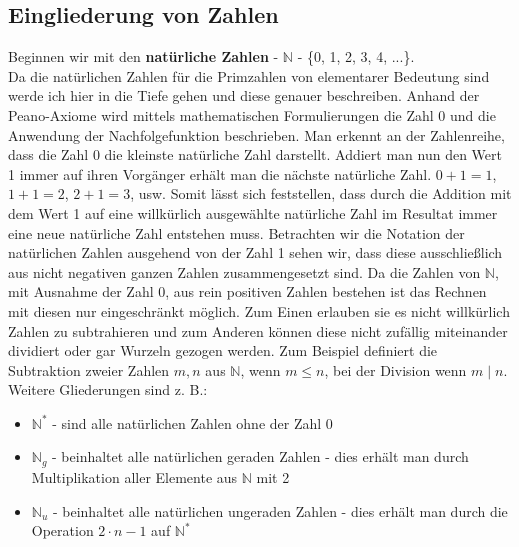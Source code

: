 \documentclass[german,12pt,a4paper]{article}
\begin{document}
\subsection{Eingliederung von Zahlen}\label{Eingliederung von Zahlen}
Beginnen wir mit den \textbf{natürliche Zahlen} - $\mathbb{N}$ - \{0, 1, 2, 3, 4, ...\}.\\
Da die natürlichen Zahlen für die Primzahlen von elementarer Bedeutung sind werde ich hier in die Tiefe gehen und diese genauer beschreiben.
Anhand der Peano-Axiome wird mittels mathematischen Formulierungen die Zahl 0 und die Anwendung der Nachfolgefunktion beschrieben.\newline 
Man erkennt an der Zahlenreihe, dass die Zahl 0 die kleinste natürliche Zahl darstellt.
Addiert man nun den Wert 1 immer auf ihren Vorgänger erhält man die nächste natürliche Zahl.
$0 + 1 = 1$, $1 + 1 = 2$, $2 + 1 = 3$, usw.
Somit lässt sich feststellen, dass durch die Addition mit dem Wert 1 auf eine willkürlich ausgewählte natürliche Zahl im Resultat immer eine neue natürliche Zahl entstehen muss.
Betrachten wir die Notation der natürlichen Zahlen ausgehend von der Zahl 1 sehen wir, dass diese ausschließlich aus nicht negativen ganzen Zahlen zusammengesetzt sind.\newline
Da die Zahlen von $\mathbb{N}$, mit Ausnahme der Zahl 0, aus rein positiven Zahlen bestehen ist das Rechnen mit diesen nur eingeschränkt möglich.
Zum Einen erlauben sie es nicht willkürlich Zahlen zu subtrahieren und zum Anderen können diese nicht zufällig miteinander dividiert oder gar Wurzeln gezogen werden.
Zum Beispiel definiert die Subtraktion zweier Zahlen $m, n$ aus $\mathbb{N}$, wenn $m \le n$, bei der Division wenn $m \mid n$.\newline
Weitere Gliederungen sind z. B.:
\begin{itemize}
\item $\mathbb{N}^*$ - sind alle natürlichen Zahlen ohne der Zahl 0
\item $\mathbb{N}_g$ - beinhaltet alle natürlichen geraden Zahlen - dies erhält man durch Multiplikation aller Elemente aus $\mathbb{N}$ mit 2
\item $\mathbb{N}_u$ - beinhaltet alle natürlichen ungeraden Zahlen - dies erhält man durch die Operation $2 \cdot n - 1$ auf $\mathbb{N}^*$
\end{itemize}
\end{document}
